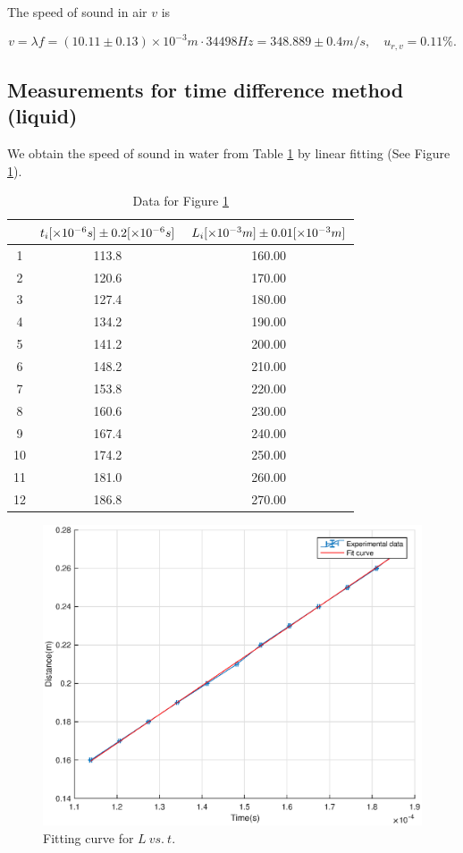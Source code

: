 The speed of sound in air $v$ is

\[
    v=\lambda f = (10.11 \pm 0.13) \times 10^{-3} m \cdot 34498 Hz  = 348.889 \pm 0.4 m/s,\quad u_{r,v}=0.11\%.
\]

\subsection{Measurements for time difference method (liquid)}

We obtain the speed of sound in water from Table \ref{data_tim} by linear fitting (See Figure \ref{lt}).
    
\begin{table}[H] \small
    \centering
    \begin{tabular}{|c|c|c|}
    \hline
        & $t_i[\times 10^{-6}s] \pm 0.2 [\times 10^{-6} s]$  & $L_i[\times 10^{-3} m] \pm 0.01 [\times 10^{-3} m]$ \\\hline
        1  & 113.8 & 160.00 \\\hline
        2  & 120.6 & 170.00 \\\hline
        3  & 127.4 & 180.00 \\\hline
        4  & 134.2 & 190.00 \\\hline
        5  & 141.2 & 200.00 \\\hline
        6  & 148.2 & 210.00 \\\hline
        7  & 153.8 & 220.00 \\\hline
        8  & 160.6 & 230.00 \\\hline
        9  & 167.4 & 240.00 \\\hline
        10 & 174.2 & 250.00 \\\hline
        11 & 181.0 & 260.00 \\\hline
        12 & 186.8 & 270.00 \\\hline
    \end{tabular}
    \caption{Data for Figure \ref{lt}}\label{data_tim}
\end{table}
\begin{figure}[H]
    \centering
    \includegraphics[width=12cm]{fig/tl}
    \caption{Fitting curve for $L\ vs.\ t$. }\label{lt}
\end{figure}

